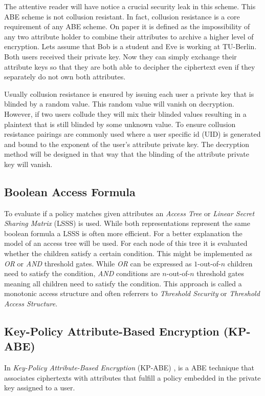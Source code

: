 The attentive reader will have notice a crucial security leak in this scheme. This \ac{ABE} scheme is not collusion resistant. In fact, collusion resistance is a core requirement of any ABE scheme. On paper it is defined as the impossibility of any two attribute holder to combine their attributes to archive a higher level of encryption. Lets assume that Bob is a student and Eve is working at \ac{TU}-Berlin. Both users received their private key. Now they can simply exchange their attribute keys so that they are both able to decipher the ciphertext even if they separately do not own both attributes.  

Usually collusion resistance is ensured by issuing each user a private key that is blinded by a random value. This random value will vanish on decryption. However, if two users collude they will mix their blinded values resulting in a plaintext that is still blinded by some unknown value. To ensure collusion resistance pairings are commonly used where a user specific id (\ac{UID}) is generated and bound to the exponent of the user's attribute private key. The decryption method will be designed in that way that the blinding of the attribute private key will vanish. 

\subsection{Boolean Access Formula}
To evaluate if a policy matches given attributes an \textit{Access Tree} or \textit{Linear Secret Sharing Matrix} (\ac{LSSS}) is used. While both representations represent the same boolean formula a \ac{LSSS} is often more efficient. For a better explanation the model of an access tree will be used. For each node of this tree it is evaluated whether the children satisfy a certain condition. This might be implemented as \textit{OR} or \textit{AND} threshold gates. While \textit{OR} can be expressed as $1$-out-of-$n$ children need to satisfy the condition, \textit{AND} conditions are $n$-out-of-$n$ threshold gates meaning all children need to satisfy the condition. This approach is called a monotonic access structure and often referrers to \textit{Threshold Security} or \textit{Threshold Access Structure}. 

\subsection{Key-Policy Attribute-Based Encryption (\ac{KP-ABE})}
In \textit{Key-Policy Attribute-Based Encryption} (\ac{KP-ABE}) \cite{goyal2006attribute}, is a \ac{ABE} technique that associates ciphertexts with attributes that fulfill a policy embedded in the private key assigned to a user. 

